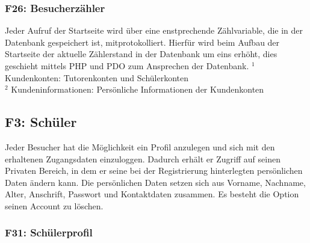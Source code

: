 \documentclass[10pt,a4paper]{scrartcl}
\begin{document}
\subsubsection*{F26: Besucherzähler}

Jeder Aufruf der Startseite wird über eine enstprechende Zählvariable, die in der Datenbank gespeichert ist, mitprotokolliert. Hierfür wird beim Aufbau der Startseite der aktuelle Zählerstand in der Datenbank um eins erhöht, dies geschieht mittels PHP und PDO zum Ansprechen der Datenbank.
\bigskip
\newline
$^1$ Kundenkonten: Tutorenkonten und Schülerkonten\\
$^2$ Kundeninformationen: Persönliche Informationen der Kundenkonten

\subsection{F3: Schüler}
Jeder Besucher hat die Möglichkeit ein Profil anzulegen und sich mit den erhaltenen Zugangsdaten einzuloggen.
Dadurch erhält er Zugriff auf seinen Privaten Bereich, in dem er seine bei der Registrierung hinterlegten persönlichen Daten ändern kann.
Die persönlichen Daten setzen sich aus Vorname, Nachname, Alter, Anschrift, Passwort und Kontaktdaten zusammen.
Es besteht die Option seinen Account zu löschen.

%
%

\subsubsection*{F31: Sch\"ulerprofil}
\end{document}
